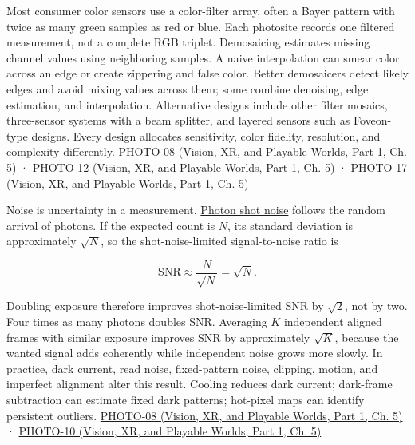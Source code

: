 Most consumer color sensors use a color-filter array, often a Bayer pattern with twice as many green samples as red or blue. Each photosite records one filtered measurement, not a complete RGB triplet. Demosaicing estimates missing channel values using neighboring samples. A naive interpolation can smear color across an edge or create zippering and false color. Better demosaicers detect likely edges and avoid mixing values across them; some combine denoising, edge estimation, and interpolation. Alternative designs include other filter mosaics, three-sensor systems with a beam splitter, and layered sensors such as Foveon-type designs. Every design allocates sensitivity, color fidelity, resolution, and complexity differently. \href{../07-Vision-XR-and-Playable-Worlds-P01/main.pdf\#nameddest=04-visual-computing-ii-ch036-photo-08---photography-session-08}{PHOTO-08 (Vision, XR, and Playable Worlds, Part 1, Ch. 5)} · \href{../07-Vision-XR-and-Playable-Worlds-P01/main.pdf\#nameddest=04-visual-computing-ii-ch036-photo-12---photography-session-12}{PHOTO-12 (Vision, XR, and Playable Worlds, Part 1, Ch. 5)} · \href{../07-Vision-XR-and-Playable-Worlds-P01/main.pdf\#nameddest=04-visual-computing-ii-ch036-photo-17---photography-session-17}{PHOTO-17 (Vision, XR, and Playable Worlds, Part 1, Ch. 5)}

Noise is uncertainty in a measurement. \hyperref[appendix-92d45cdf2afc]{Photon shot noise} follows the random arrival of photons. If the expected count is \(N\), its standard deviation is approximately \(\sqrt{N}\), so the shot-noise-limited signal-to-noise ratio is

\[
\mathrm{SNR}\approx\frac{N}{\sqrt{N}}=\sqrt{N}.
\]

Doubling exposure therefore improves shot-noise-limited SNR by \(\sqrt 2\), not by two. Four times as many photons doubles SNR. Averaging \(K\) independent aligned frames with similar exposure improves SNR by approximately \(\sqrt K\), because the wanted signal adds coherently while independent noise grows more slowly. In practice, dark current, read noise, fixed-pattern noise, clipping, motion, and imperfect alignment alter this result. Cooling reduces dark current; dark-frame subtraction can estimate fixed dark patterns; hot-pixel maps can identify persistent outliers. \href{../07-Vision-XR-and-Playable-Worlds-P01/main.pdf\#nameddest=04-visual-computing-ii-ch036-photo-08---photography-session-08}{PHOTO-08 (Vision, XR, and Playable Worlds, Part 1, Ch. 5)} · \href{../07-Vision-XR-and-Playable-Worlds-P01/main.pdf\#nameddest=04-visual-computing-ii-ch036-photo-10---photography-session-10}{PHOTO-10 (Vision, XR, and Playable Worlds, Part 1, Ch. 5)}

